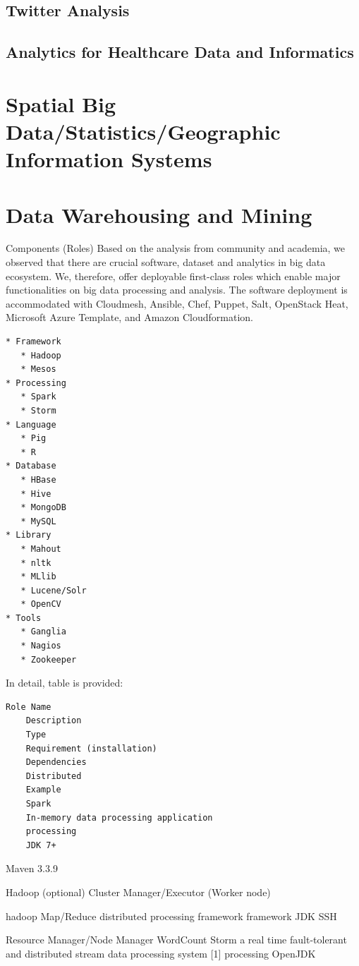 \documentclass[9pt,twocolumn,twoside]{styles/osajnl}
\begin{document}
\subsection{Twitter Analysis}


\subsection{Analytics for Healthcare Data and Informatics}

\section{Spatial Big Data/Statistics/Geographic Information Systems}

\section{Data Warehousing and Mining}

Components (Roles)
Based on the analysis from community and academia, we observed that there are crucial software, dataset and analytics in big data ecosystem. We, therefore, offer deployable first-class roles which enable major functionalities on big data processing and analysis. The software deployment is accommodated with Cloudmesh, Ansible, Chef, Puppet, Salt, OpenStack Heat, Microsoft Azure Template, and Amazon Cloudformation.

\begin{verbatim}
* Framework
   * Hadoop
   * Mesos
* Processing
   * Spark
   * Storm
* Language
   * Pig
   * R
* Database
   * HBase
   * Hive
   * MongoDB
   * MySQL
* Library
   * Mahout
   * nltk
   * MLlib
   * Lucene/Solr
   * OpenCV
* Tools
   * Ganglia
   * Nagios
   * Zookeeper
\end{verbatim}

In detail, table is provided:

\begin{verbatim}
Role Name
	Description
	Type
	Requirement (installation)
	Dependencies
	Distributed
	Example
	Spark
	In-memory data processing application
	processing
	JDK 7+
\end{verbatim}

Maven 3.3.9

	Hadoop (optional)
	Cluster Manager/Executor (Worker node)
	

	hadoop
	Map/Reduce distributed processing framework
	framework
	JDK
SSH
	

	Resource Manager/Node Manager
	WordCount
	Storm
	a real time fault-tolerant and distributed stream data processing system [1]
	processing
	OpenJDK
\end{document}
